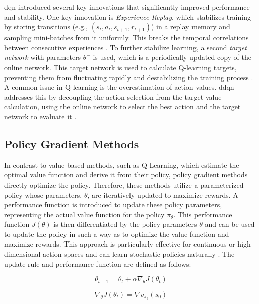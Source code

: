 \gls{dqn} introduced several key innovations that significantly improved performance and stability.
One key innovation is \textit{Experience Replay}, which stabilizes training by storing transitions (e.g., $(s_t, a_t, s_{t+1}, r_{t+1})$) in a replay memory and sampling mini-batches from it uniformly.
This breaks the temporal correlations between consecutive experiences \cite{mnih_human-level_2015}.
To further stabilize learning, a second \textit{target network} with parameters $\theta^-$ is used, which is a periodically updated copy of the online network.
This target network is used to calculate Q-learning targets, preventing them from fluctuating rapidly and destabilizing the training process \cite{mnih_human-level_2015}.
A common issue in Q-learning is the overestimation of action values.
\gls{ddqn} addresses this by decoupling the action selection from the target value calculation, using the online network to select the best action and the target network to evaluate it \cite{hasselt_deep_2016}.

\subsection{Policy Gradient Methods}\label{sec:background-reinforcement_learning-pgm}
In contrast to value-based methods, such as Q-Learning, which estimate the optimal value function and derive it from their policy, policy gradient methods directly optimize the policy.
Therefore, these methods utilize a parameterized policy whose parameters, $\theta$, are iteratively updated to maximize rewards.
A performance function is introduced to update these policy parameters, representing the actual value function for the policy $\pi_\theta$.
This performance function $J(\theta)$ is then differentiated by the policy parameters $\theta$ and can be used to update the policy in such a way as to optimize the value function and maximize rewards.
This approach is particularly effective for continuous or high-dimensional action spaces and can learn stochastic policies naturally \cite{sewak_policy-approximation_2022}.
The update rule and performance function are defined as follows:

\begin{equation}\label{eq:policy-gradient-update-rule}
    \theta_{t+1} = \theta_t + \alpha \nabla_\theta J(\theta_t)
\end{equation}

\begin{equation}\label{eq:policy-gradient-performance-measure}
\nabla_\theta J(\theta_t) = \nabla v_{\pi_\theta}(s_0)
\end{equation}

